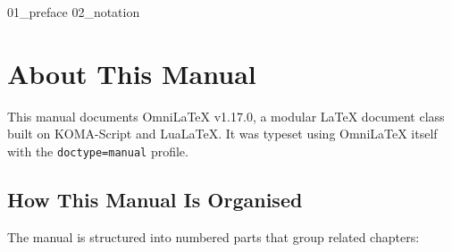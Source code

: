 


{01_preface}
{02_notation}

\cleardoubleoddpage
{}
\tableofcontents

\cleardoubleoddpage
{}
\listoffigures

\cleardoubleoddpage
{}
\listoftables

\cleardoubleoddpage

\section*{About This Manual}

This manual documents OmniLaTeX v1.17.0, a modular \LaTeX{} document class
built on KOMA-Script and LuaLaTeX.  It was typeset using OmniLaTeX itself
with the \texttt{doctype=manual} profile.

\subsection*{How This Manual Is Organised}

The manual is structured into numbered parts that group related chapters:

